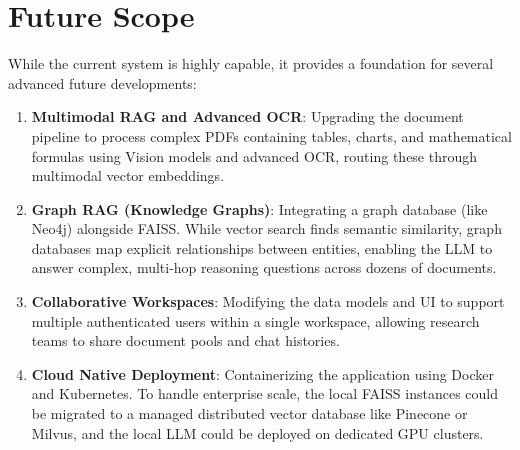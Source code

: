 \documentclass[12pt, a4paper]{report}
\begin{document}
\section{Future Scope}
While the current system is highly capable, it provides a foundation for several advanced future developments:
\begin{enumerate}
    \item \textbf{Multimodal RAG and Advanced OCR}: Upgrading the document pipeline to process complex PDFs containing tables, charts, and mathematical formulas using Vision models and advanced OCR, routing these through multimodal vector embeddings.
    \item \textbf{Graph RAG (Knowledge Graphs)}: Integrating a graph database (like Neo4j) alongside FAISS. While vector search finds semantic similarity, graph databases map explicit relationships between entities, enabling the LLM to answer complex, multi-hop reasoning questions across dozens of documents.
    \item \textbf{Collaborative Workspaces}: Modifying the data models and UI to support multiple authenticated users within a single workspace, allowing research teams to share document pools and chat histories.
    \item \textbf{Cloud Native Deployment}: Containerizing the application using Docker and Kubernetes. To handle enterprise scale, the local FAISS instances could be migrated to a managed distributed vector database like Pinecone or Milvus, and the local LLM could be deployed on dedicated GPU clusters.
\end{enumerate}
\end{document}
